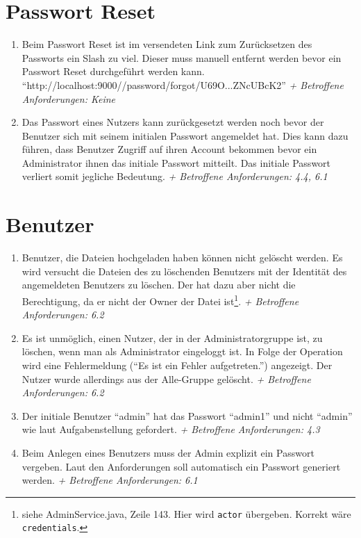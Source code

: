 \documentclass[12pt,DIV14,BCOR10mm,a4paper,parskip=half-,headsepline,headinclude,english,ngerman,bibliography=totocnumbered]{scrreprt}
\begin{document}
 \section{Passwort Reset}
\begin{enumerate}[resume]
\item Beim Passwort Reset ist im versendeten Link zum Zurücksetzen des Passworts ein Slash zu viel. Dieser muss manuell entfernt werden bevor ein Passwort Reset durchgeführt werden kann.\newline
\enquote{http://localhost:9000//password/forgot/U69O...ZNcUBcK2}\newline
\textit{+ Betroffene Anforderungen: Keine}

\item Das Passwort eines Nutzers kann zurückgesetzt werden noch bevor der Benutzer sich mit seinem initialen Passwort angemeldet hat. Dies kann dazu führen, dass Benutzer Zugriff auf ihren Account bekommen bevor ein Administrator ihnen das initiale Passwort mitteilt. Das initiale Passwort verliert somit jegliche Bedeutung.\newline
\textit{+ Betroffene Anforderungen: 4.4, 6.1}
  \end{enumerate}


\section{Benutzer}
\begin{enumerate}[resume]
\item Benutzer, die Dateien hochgeladen haben können nicht gelöscht werden. Es wird versucht die Dateien des zu löschenden Benutzers mit der Identität des angemeldeten Benutzers zu löschen. Der hat dazu aber nicht die Berechtigung, da er nicht der Owner der Datei ist\footnote{siehe AdminService.java, Zeile 143. Hier wird \texttt{actor} übergeben. Korrekt wäre \texttt{credentials}.}.\newline
\textit{+ Betroffene Anforderungen: 6.2} 

\item Es ist unmöglich, einen Nutzer, der in der Administratorgruppe ist, zu löschen, wenn man als Administrator eingeloggt ist. In Folge der Operation wird eine Fehlermeldung (\enquote{Es ist ein Fehler aufgetreten.}) angezeigt. Der Nutzer wurde allerdings aus der Alle-Gruppe gelöscht.\newline
\textit{+ Betroffene Anforderungen: 6.2} 


\item Der initiale Benutzer \enquote{admin} hat das Passwort \enquote{admin1} und nicht \enquote{admin} wie laut Aufgabenstellung gefordert.\newline
\textit{+ Betroffene Anforderungen: 4.3} 


\item Beim Anlegen eines Benutzers muss der Admin explizit ein Passwort vergeben. Laut den Anforderungen soll automatisch ein Passwort generiert werden.\newline
\textit{+ Betroffene Anforderungen: 6.1} 
 \end{enumerate}
\end{document}
